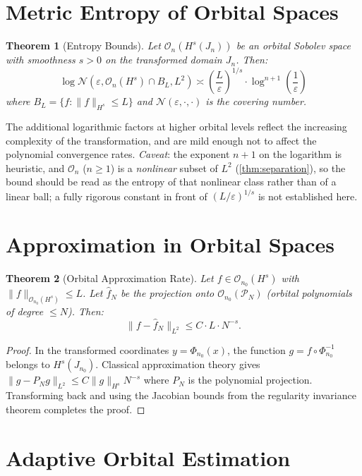 \documentclass[11pt,twoside,openright]{book}
\theoremstyle{plain}
\newtheorem{theorem}{Theorem}[chapter]
\theoremstyle{definition}
\theoremstyle{remark}
\newcommand{\calO}{\mathcal{O}}
\newcommand{\calN}{\mathcal{N}}
\newcommand{\calP}{\mathcal{P}}
\newcommand{\norm}[1]{\|#1\|}
\begin{document}
\section{Metric Entropy of Orbital Spaces}

\begin{theorem}[Entropy Bounds]
\label{thm:entropy}
Let $\calO_n(H^s(J_n))$ be an orbital Sobolev space with smoothness $s > 0$ on the transformed domain $J_n$. Then:
\[
\log \calN(\varepsilon, \calO_n(H^s) \cap B_L, L^2) \asymp \left(\frac{L}{\varepsilon}\right)^{1/s} \cdot \log^{n+1}\left(\frac{1}{\varepsilon}\right)
\]
where $B_L = \{f : \norm{f}_{H^s} \leq L\}$ and $\calN(\varepsilon, \cdot, \cdot)$ is the covering number.
\end{theorem}

The additional logarithmic factors at higher orbital levels reflect the increasing complexity of the transformation, and are mild enough not to affect the polynomial convergence rates. \emph{Caveat}: the exponent $n+1$ on the logarithm is heuristic, and $\calO_n$ ($n\ge1$) is a \emph{nonlinear} subset of $L^2$ (\cref{thm:separation}), so the bound should be read as the entropy of that nonlinear class rather than of a linear ball; a fully rigorous constant in front of $(L/\varepsilon)^{1/s}$ is not established here.

\section{Approximation in Orbital Spaces}

\begin{theorem}[Orbital Approximation Rate]
\label{thm:orbital-approx}
Let $f \in \calO_{n_0}(H^s)$ with $\norm{f}_{\calO_{n_0}(H^s)} \leq L$. Let $\hat{f}_N$ be the projection onto $\calO_{n_0}(\calP_N)$ (orbital polynomials of degree $\leq N$). Then:
\[
\norm{f - \hat{f}_N}_{L^2} \leq C \cdot L \cdot N^{-s}.
\]
\end{theorem}

\begin{proof}
In the transformed coordinates $y = \Phi_{n_0}(x)$, the function $g = f \circ \Phi_{n_0}^{-1}$ belongs to $H^s(J_{n_0})$. Classical approximation theory gives $\norm{g - P_N g}_{L^2} \leq C \norm{g}_{H^s} N^{-s}$ where $P_N$ is the polynomial projection. Transforming back and using the Jacobian bounds from the regularity invariance theorem completes the proof.
\end{proof}

\section{Adaptive Orbital Estimation}
\end{document}
